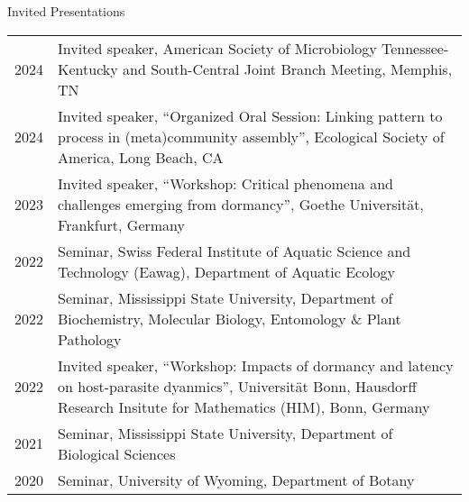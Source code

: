 \documentclass{resume} %
\begin{document}
\bigskip
\begin{rSection}{Invited Presentations}
{\def\arraystretch{1.2}
\begin{xltabular}{\textwidth}{l>{\raggedright\arraybackslash}X}
2024 & Invited speaker, American Society of Microbiology Tennessee-Kentucky and South-Central Joint Branch Meeting, Memphis, TN\\

2024 & Invited speaker, ``Organized Oral Session: Linking pattern to process in (meta)community assembly'', Ecological Society of America, Long Beach, CA\\

2023 & Invited speaker, ``Workshop: Critical phenomena and challenges emerging from dormancy'', Goethe Universität, Frankfurt, Germany\\

2022 & Seminar, Swiss Federal Institute of Aquatic Science and Technology (Eawag), Department of Aquatic Ecology\\

2022 & Seminar, Mississippi State University, Department of Biochemistry, Molecular Biology, Entomology \& Plant Pathology\\

2022 & Invited speaker, ``Workshop: Impacts of dormancy and latency on host-parasite dyanmics'', Universität Bonn, Hausdorff Research Insitute for Mathematics (HIM), Bonn, Germany\\

2021 & Seminar, Mississippi State University, Department of Biological Sciences\\

2020 & Seminar, University of Wyoming, Department of Botany\\
\end{xltabular}
}

\end{rSection}
\end{document}

